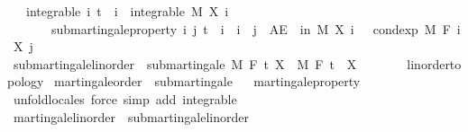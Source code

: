 \begin{isabellebody}
\ \ \ integrable{\isacharcolon}{\kern0pt}\ {\isachardoublequoteopen}{\isasymAnd}i{\isachardot}{\kern0pt}\ t\ {\isasymle}\ i\ {\isasymLongrightarrow}\ integrable\ M\ {\isacharparenleft}{\kern0pt}X\ i{\isacharparenright}{\kern0pt}{\isachardoublequoteclose}\isanewline
\ \ \ \ \ \ \ submartingale{\isacharunderscore}{\kern0pt}property{\isacharcolon}{\kern0pt}\ {\isachardoublequoteopen}{\isasymAnd}i\ j{\isachardot}{\kern0pt}\ t\ {\isasymle}\ i\ {\isasymLongrightarrow}\ i\ {\isasymle}\ j\ {\isasymLongrightarrow}\ AE\ {\isasymxi}\ in\ M{\isachardot}{\kern0pt}\ X\ i\ {\isasymxi}\ {\isasymle}\ cond{\isacharunderscore}{\kern0pt}exp\ M\ {\isacharparenleft}{\kern0pt}F\ i{\isacharparenright}{\kern0pt}\ {\isacharparenleft}{\kern0pt}X\ j{\isacharparenright}{\kern0pt}\ {\isasymxi}{\isachardoublequoteclose}\isanewline
\isanewline
{}\isamarkupfalse%
\ submartingale{\isacharunderscore}{\kern0pt}linorder\ {\isacharequal}{\kern0pt}\ submartingale\ M\ F\ t\ X\ \ M\ F\ t\ \ X\ {\isacharcolon}{\kern0pt}{\isacharcolon}{\kern0pt}\ {\isachardoublequoteopen}{\isacharunderscore}{\kern0pt}\ {\isasymRightarrow}\ {\isacharunderscore}{\kern0pt}\ {\isasymRightarrow}\ {\isacharunderscore}{\kern0pt}\ {\isacharcolon}{\kern0pt}{\isacharcolon}{\kern0pt}\ {\isacharbraceleft}{\kern0pt}linorder{\isacharunderscore}{\kern0pt}topology{\isacharbraceright}{\kern0pt}{\isachardoublequoteclose}\isanewline
\isanewline
{}\isamarkupfalse%
\ martingale{\isacharunderscore}{\kern0pt}order\ {\isasymsubseteq}\ submartingale%
\isadelimproof
\ %
\endisadelimproof
%
\isatagproof
{}\isamarkupfalse%
\ martingale{\isacharunderscore}{\kern0pt}property\ \isamarkupfalse%
\ {\isacharparenleft}{\kern0pt}unfold{\isacharunderscore}{\kern0pt}locales{\isacharparenright}{\kern0pt}\ {\isacharparenleft}{\kern0pt}force\ simp\ add{\isacharcolon}{\kern0pt}\ integrable{\isacharparenright}{\kern0pt}{\isacharplus}{\kern0pt}%
\endisatagproof
{\isafoldproof}%
%
\isadelimproof
%
\endisadelimproof
\isanewline
{}\isamarkupfalse%
\ martingale{\isacharunderscore}{\kern0pt}linorder\ {\isasymsubseteq}\ submartingale{\isacharunderscore}{\kern0pt}linorder%
\isadelimproof
\ %
\endisadelimproof
%
\isatagproof
\isacommand{{\isachardot}{\kern0pt}{\isachardot}{\kern0pt}}\isamarkupfalse%
%
\endisatagproof
{\isafoldproof}%
%
\isadelimproof
%
\endisadelimproof
%
\isadelimdocument
%
\endisadelimdocument

\end{isabellebody}
